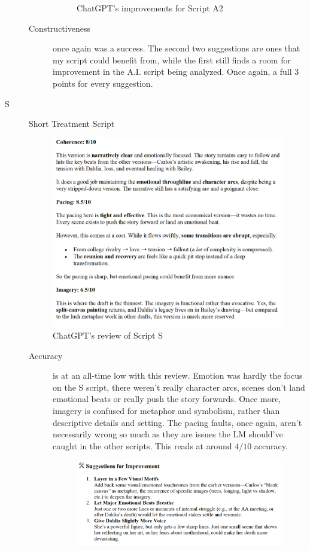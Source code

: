 \documentclass[sigconf]{acmart}
\begin{document}
\begin{description}
\begin{description}
\begin{figure}[!hbt]
            \caption{ChatGPT's improvements for Script A2}
            \label{fig:a2-improvements}
        \end{figure}
        \item[Constructiveness] once again was a success. The second two suggestions are ones that my script could benefit from, while the first still finds a room for improvement in the A.I. script being analyzed. Once again, a full $3$ points for every suggestion.
    \end{description}
    \item[S] Short Treatment Script
    \begin{figure}[!hbt]
            \centering
            \includegraphics[width=0.5\linewidth]{images/SMetrics.png}
            \caption{ChatGPT's review of Script S}
            \label{fig:s-metrics}
    \end{figure}
    \begin{description}
        \item[Accuracy] is at an all-time low with this review. Emotion was hardly the focus on the S script, there weren't really character arcs, scenes don't land emotional beats or really push the story forwards. Once more, imagery is confused for metaphor and symbolism, rather than descriptive details and setting. The pacing faults, once again, aren't necessarily wrong so much as they are issues the LM should've caught in the other scripts. This reads at around $4/10$ accuracy.
        \begin{figure}[!hbt]
            \centering
            \includegraphics[width=0.8\linewidth]{images/SImprovements.png}

\end{figure}
\end{description}
\end{description}
\end{document}
